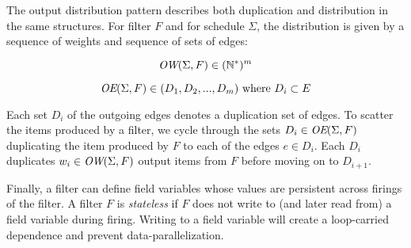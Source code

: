 The output distribution pattern describes both duplication and
distribution in the same structures. For filter $F$ and for schedule
$\Sigma$, the distribution is given by a sequence of weights and
sequence of sets of edges:

\[ \mbox{\it OW}(\Sigma, F)  \in (\mathbb{N}^{*})^m \]

\[ \mbox{\it OE}(\Sigma, F) \in (D_1, D_2, ..., D_m)  \mbox{ where }  D_i \subset
E \]

Each set $D_i$ of the outgoing edges denotes a duplication set of
edges. To scatter the items produced by a filter, we cycle through the
sets $D_i \in \mbox{\it OE}(\Sigma, F)$ duplicating the item produced by $F$
to each of the edges $e \in D_i$. Each $D_i$ duplicates $w_i \in
\mbox{\it OW}(\Sigma, F)$ output items from $F$ before moving on to
$D_{i+1}$.

Finally, a filter can define field variables whose values are
persistent across firings of the filter.  A filter $F$ is {\it
stateless} if $F$ does not write to (and later read from) a field
variable during firing.  Writing to a field variable will create a
loop-carried dependence and prevent data-parallelization.

